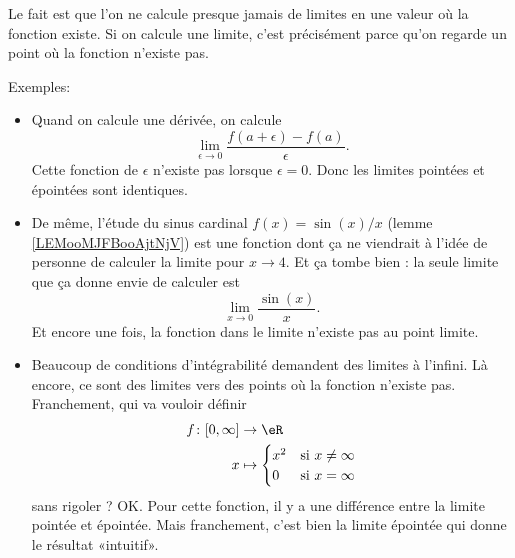 Le fait est que l'on ne calcule presque jamais de limites en une valeur où la fonction existe. Si on calcule une limite, c'est précisément parce qu'on regarde un point où la fonction n'existe pas.

Exemples:
\begin{itemize}
	\item Quand on calcule une dérivée, on calcule
	      \begin{equation}
		      \lim_{\epsilon\to 0}\frac{ f(a+\epsilon)-f(a) }{ \epsilon }.
	      \end{equation}
	      Cette fonction de \( \epsilon\) n'existe pas lorsque \( \epsilon=0\). Donc les limites pointées et épointées sont identiques.
	\item
	      De même, l'étude du sinus cardinal \( f(x)=\sin(x)/x\) (lemme \ref{LEMooMJFBooAjtNjV}) est une fonction dont ça ne viendrait à l'idée de personne de calculer la limite pour \( x\to 4\). Et ça tombe bien : la seule limite que ça donne envie de calculer est
	      \begin{equation}
		      \lim_{x\to 0} \frac{ \sin(x) }{ x }.
	      \end{equation}
	      Et encore une fois, la fonction dans le limite n'existe pas au point limite.
	\item
	      Beaucoup de conditions d'intégrabilité demandent des limites à l'infini. Là encore, ce sont des limites vers des points où la fonction n'existe pas. Franchement, qui va vouloir définir
	      \begin{equation}
		      \begin{aligned}
			      f\colon \mathopen[ 0 , \infty \mathclose] & \to \eR                            \\
			      x                                         & \mapsto \begin{cases}
				      x^2 & \text{si } x\neq \infty \\
				      0   & \text{si } x=\infty
			      \end{cases}
		      \end{aligned}
	      \end{equation}
	      sans rigoler ?  OK. Pour cette fonction, il y a une différence entre la limite pointée et épointée. Mais franchement, c'est bien la limite épointée qui donne le résultat «intuitif».
\end{itemize}

